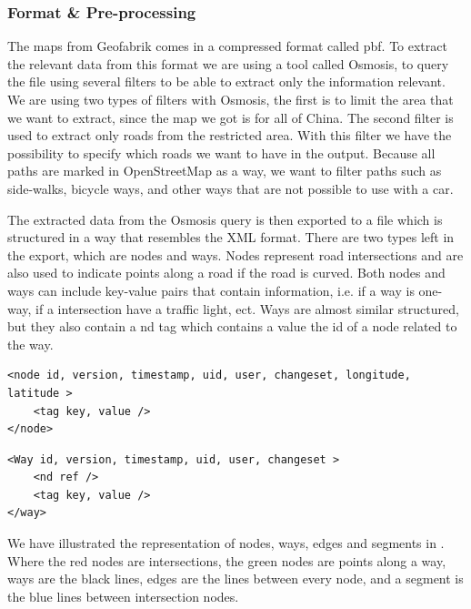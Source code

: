 \subsubsection{Format \& Pre-processing}
The maps from Geofabrik comes in a compressed format called pbf. To extract the relevant data from this format we are using a tool called Osmosis, to query the file using several filters to be able to extract only the information relevant.
We are using two types of filters with Osmosis, the first is to limit the area that we want to extract, since the map we got is for all of China. The second filter is used to extract only roads from the restricted area.
With this filter we have the possibility to specify which roads we want to have in the output. Because all paths are marked in OpenStreetMap as a way, we want to filter paths such as side-walks, bicycle ways, and other ways that are not possible to use with a car.

The extracted data from the Osmosis query is then exported to a file which is structured in a way that resembles the XML format. There are two types left in the export, which are nodes and ways. Nodes represent road intersections and are also used to indicate points along a road if the road is curved. Both nodes and ways can include key-value pairs that contain information, i.e. if a way is one-way, if a intersection have a traffic light, ect.
Ways are almost similar structured, but they also contain a nd tag which contains a value the id of a node related to the way.

\begin{lstlisting}[style=XML, caption=Node representation]
<node id, version, timestamp, uid, user, changeset, longitude, latitude >
	<tag key, value />
</node>
\end{lstlisting}

\begin{lstlisting}[style=XML, caption=Way representation]
<Way id, version, timestamp, uid, user, changeset >
	<nd ref />
	<tag key, value />
</way>
\end{lstlisting}

We have illustrated the representation of nodes, ways, edges and segments in . Where the red nodes are intersections, the green nodes are points along a way, ways are the black lines, edges are the lines between every node, and a segment is the blue lines between intersection nodes.

